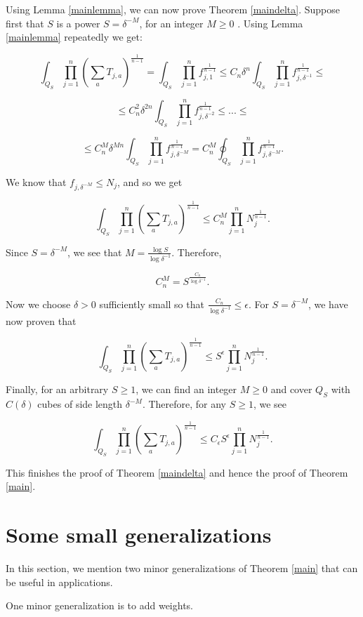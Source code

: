 \documentclass{amsart}
\newcommand{\eps}{\epsilon}
\begin{document}
Using Lemma \ref{mainlemma}, we can now prove Theorem \ref{maindelta}.
Suppose first that $S$ is a power $S = \delta^{-M}$, for an integer $M \ge 0$ .  Using Lemma \ref{mainlemma} repeatedly we get:

$$ \int_{Q_S} \prod_{j=1}^n \left( \sum_{a} T_{j,a} \right)^\frac{1}{n-1} = \int_{Q_S} \prod_{j=1}^n f_{j, 1}^\frac{1}{n-1} \le C_n \delta^n \int_{Q_S} \prod_{j=1}^n f_{j, \delta^{-1}}^\frac{1}{n-1} \le $$

$$ \le C_n^2 \delta^{2n} \int_{Q_S} \prod_{j=1}^n f_{j, \delta^{-2}}^\frac{1}{n-1} \le ...
\le $$

$$ \le C_n^M \delta^{Mn} \int_{Q_S} \prod_{j=1}^n f_{j, \delta^{-M}}^\frac{1}{n-1} = C_n^M \oint_{Q_S} \prod_{j=1}^n f_{j, \delta^{-M}}^\frac{1}{n-1} . $$

We know that $f_{j, \delta^{-M}} \le N_j$, and so we get

$$  \int_{Q_S} \prod_{j=1}^n \left( \sum_{a} T_{j,a} \right)^\frac{1}{n-1} \le C_n^M \prod_{j=1}^n N_j^\frac{1}{n-1}. $$

Since $S = \delta^{-M}$, we see that $M = \frac{ \log S} { \log \delta^{-1}}$.  Therefore,

$$ C_n^M = S^{\frac{C_n}{\log \delta^{-1}}}. $$

Now we choose $\delta > 0$ sufficiently small so that $\frac{C_n}{\log \delta^{-1}} \le \eps$.  For $S = \delta^{-M}$, we have now proven that

$$  \int_{Q_S} \prod_{j=1}^n \left( \sum_{a} T_{j,a} \right)^\frac{1}{n-1} \le S^\eps \prod_{j=1}^n N_j^\frac{1}{n-1}. $$

Finally, for an arbitrary $S \ge 1$, we can find an integer $M \ge 0$ and cover $Q_S$ with $C(\delta)$ cubes of side length $\delta^{-M}$.  Therefore, for any $S \ge 1$, we see

$$  \int_{Q_S} \prod_{j=1}^n \left( \sum_{a} T_{j,a} \right)^\frac{1}{n-1} \le C_\eps S^\eps \prod_{j=1}^n N_j^\frac{1}{n-1}. $$

This finishes the proof of Theorem \ref{maindelta} and hence the proof of Theorem \ref{main}.  

\section{Some small generalizations}

In this section, we mention two minor generalizations of Theorem \ref{main} that can be useful in applications.  

One minor generalization is to add weights.
\end{document}
